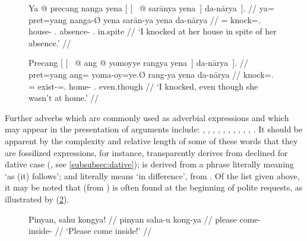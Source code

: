 \begin{figure}
\pex\label{ex:danaarya}
\a\label{ex:danaarya1}\begingl[glspace=.25em]
	\gla Ya @ precang nanga yena \textup{[ [~} @ sarānya 
		yena~\textup{]} da-nārya~\textup{]}. //
	\glb ya= pret=yang nanga-Ø yena {} sarān-ya yena da-nārya //
	\glc \LocT{}= knock=\Fsg{}.\Aarg{} house-\Top{} \TsgF{}.\Gen{} {}
		absence-\Loc{} \TsgF{}.\Gen{} in.spite //
	\glft `I knocked at her house in spite of her absence.' //
\endgl

\a\label{ex:danaarya2}\begingl
	\gla Precang \textup{[ [~} @ ang @ yomoyye rangya 
		yena~\textup{]} da-nārya~\textup{]}. //
	\glb pret=yang {} ang= yoma-oy=ye.Ø rang-ya yena da-nārya //
	\glc knock=\Fsg{}.\Aarg{} {} \AgtT{}= exist-\Neg{}=\TsgF{}.\Top{} 
		home-\Loc{} \TsgF{}.\Gen{} even.though //
	\glft `I knocked, even though she wasn't at home.' //
\endgl
\xe
\end{figure}

Further adverbs which are commonly used as adverbial expressions and which may 
appear in the presentation of arguments include:
,
,
,
,
,
,
,
,
,
,
.
It should be apparent by the complexity and relative length of some of these 
words that they are fossilized expressions, for instance, 
 transparently derives from 
 declined for dative case
(, see \autoref{subsubsec:dative}); 
 is derived from a phrase literally meaning `as 
(it) follows'; and  literally 
means `in difference', from . Of the list given above, it may be noted that 
 (from ) is often found 
at the beginning of polite requests, as illustrated by (\ref{ex:request}).

\begin{figure}[h]
\ex\label{ex:request}
\begingl
	\gla Pinyan, sahu kongya! //
	\glb pinyan saha-u kong-ya //
	\glc please come-\Imp{} inside-\Loc{} //
	\glft `Please come inside!' //
\endgl
\xe
\end{figure}

